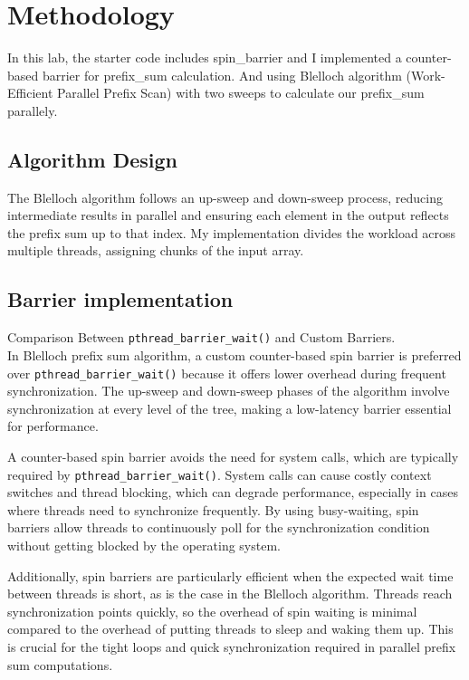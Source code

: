 \documentclass[letterpaper,12pt]{article}
\theoremstyle{remark}
\begin{document}
\section{Methodology}
In this lab, the starter code includes spin\_barrier and I implemented a counter-based barrier for prefix\_sum calculation. And using Blelloch algorithm (Work-Efficient Parallel Prefix Scan) with two sweeps to calculate our prefix\_sum parallely.\\


\subsection{Algorithm Design}
The Blelloch algorithm follows an up-sweep and down-sweep process, reducing intermediate results in parallel and ensuring each element in the output reflects the prefix sum up to that index. My implementation divides the workload across multiple threads, assigning chunks of the input array.

\subsection{Barrier implementation}
Comparison Between \texttt{pthread\_barrier\_wait()} and Custom Barriers.\\
\noindent In Blelloch prefix sum algorithm, a custom counter-based spin barrier is preferred over \texttt{pthread\_barrier\_wait()} because it offers lower overhead during frequent synchronization. The up-sweep and down-sweep phases of the algorithm involve synchronization at every level of the tree, making a low-latency barrier essential for performance.

\medskip
\noindent A counter-based spin barrier avoids the need for system calls, which are typically required by \texttt{pthread\_barrier\_wait()}. System calls can cause costly context switches and thread blocking, which can degrade performance, especially in cases where threads need to synchronize frequently. By using busy-waiting, spin barriers allow threads to continuously poll for the synchronization condition without getting blocked by the operating system.

\medskip
\noindent Additionally, spin barriers are particularly efficient when the expected wait time between threads is short, as is the case in the Blelloch algorithm. Threads reach synchronization points quickly, so the overhead of spin waiting is minimal compared to the overhead of putting threads to sleep and waking them up. This is crucial for the tight loops and quick synchronization required in parallel prefix sum computations. \\
\end{document}
